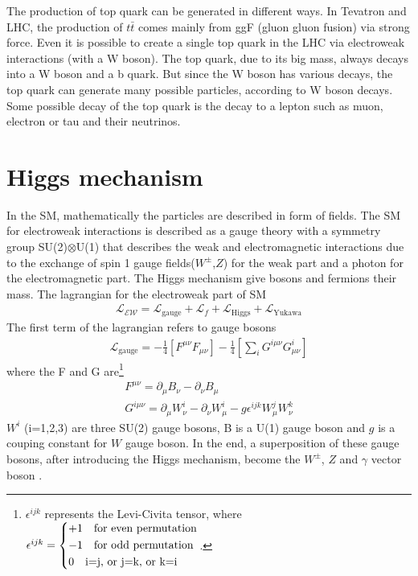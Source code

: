 The production of top quark can be generated in different ways. In Tevatron and LHC, the production of $t\bar{t}$ comes mainly from ggF (gluon gluon fusion) via strong force. Even it is possible to create a single top quark in the LHC via electroweak interactions (with a W boson)\cite{th1}. 
The top quark, due to its big mass, always decays into a W boson and a b quark. But since the W boson has various decays, the top quark can generate many possible particles, according to W boson decays. Some possible decay of the top quark is the decay to a lepton such as muon, electron or tau and their neutrinos. %

\section{Higgs mechanism}
In the SM, mathematically the particles are described in form of fields. The SM for electroweak interactions is described as a gauge theory with a symmetry group SU(2)$\otimes$U(1)
that describes the weak and electromagnetic interactions
due to the exchange of spin 1 gauge fields($W^{\pm}$,$Z$) for the weak part and a photon for the electromagnetic part. The Higgs mechanism give bosons and fermions their mass. The lagrangian for the electroweak part of SM
\begin{align}\label{sml}
\mathcal{L_{\text{EW}}}=\mathcal{L}_\text{gauge}+\mathcal{L}_f +\mathcal{L}_\text{Higgs} + \mathcal{L}_\text{Yukawa}
\end{align}
The first term of the lagrangian refers to gauge bosons 
 \begin{align}\label{smg}
 \mathcal{L}_\text{gauge}=-\frac{1}{4}\left[F^{\mu\nu}F_{\mu\nu}\right]-\frac{1}{4}\left[\sum_{i}G^{i\mu\nu}G^i_{\mu\nu}\right]
 \end{align}
where the F and G are\footnote{$\epsilon^{ijk}$ represents the Levi-Civita tensor, where $\epsilon^{ijk}= \begin{dcases}
	+1 \quad \text{for even permutation} \\
	-1 \quad \text{for odd permutation}\\
	0 \quad \text{i=j, or j=k, or k=i } 
	\end{dcases}$.} 
\begin{align}
F^{\mu \nu}=\partial_\mu B_\nu -\partial_\nu B_\mu \\
G^{i\mu\nu}=\partial_\mu W^i_\nu -\partial_\nu W^i_\mu -g\epsilon^{ijk}W^j_\mu W^k_\nu 
\end{align}
$W^i$ (i=1,2,3) are three SU(2) gauge bosons, B is a U(1) gauge boson and $g$  is a couping constant for $W$ gauge boson. In the end, a superposition of these gauge bosons, after introducing the Higgs mechanism, become the $W^\pm$, $Z$ and $\gamma$ vector boson
\cite{ew1,ew2}. %

